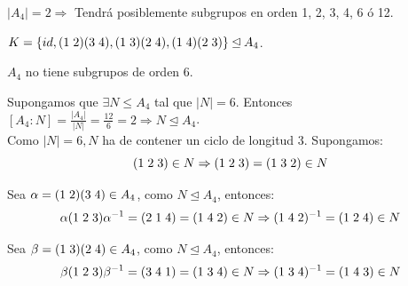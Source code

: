\documentclass[11pt,a4paper]{article}
\begin{document}
$|A_{4}| = 2 \Rightarrow$ Tendrá posiblemente subgrupos en orden 1, 2, 3, 4, 6 ó 12.

$K = \{id, (1 \hspace{0.1cm} 2)(3 \hspace{0.1cm} 4), (1 \hspace{0.1cm} 3)(2 \hspace{0.1cm} 4), (1 \hspace{0.1cm} 4)(2 \hspace{0.1cm} 3)\} \unlhd A_{4}$.

$A_{4}$ no tiene subgrupos de orden 6.

Supongamos que $\exists N \leqslant A_{4}$ tal que $|N| = 6$. Entonces $[A_{4}:N] = \frac{|A_{4}|}{|N|} = \frac{12}{6} = 2 \Rightarrow N \unlhd A_{4}$. \\
Como $|N| = 6, N$ ha de contener un ciclo de longitud 3. Supongamos:
$$(1 \hspace{0.1cm} 2 \hspace{0.1cm} 3) \in N \Rightarrow (1 \hspace{0.1cm} 2 \hspace{0.1cm} 3) = (1 \hspace{0.1cm} 3 \hspace{0.1cm} 2) \in N$$

Sea $\alpha = (1 \hspace{0.1cm} 2)(3 \hspace{0.1cm} 4) \in A_{4}$, como $N \unlhd A_{4}$, entonces:
$$\alpha (1 \hspace{0.1cm} 2 \hspace{0.1cm} 3) \alpha^{-1} = (2 \hspace{0.1cm} 1 \hspace{0.1cm} 4) = (1 \hspace{0.1cm} 4 \hspace{0.1cm} 2) \in N \Rightarrow (1 \hspace{0.1cm} 4 \hspace{0.1cm} 2)^{-1} = (1 \hspace{0.1cm} 2 \hspace{0.1cm} 4) \in N$$

Sea $\beta = (1 \hspace{0.1cm} 3)(2 \hspace{0.1cm} 4) \in A_{4}$, como $N \unlhd A_{4}$, entonces:
$$\beta(1 \hspace{0.1cm} 2 \hspace{0.1cm} 3) \beta^{-1} = (3 \hspace{0.1cm} 4 \hspace{0.1cm} 1) = (1 \hspace{0.1cm} 3 \hspace{0.1cm} 4) \in N \Rightarrow (1 \hspace{0.1cm} 3 \hspace{0.1cm} 4)^{-1} = (1 \hspace{0.1cm} 4 \hspace{0.1cm} 3) \in N$$
\end{document}
